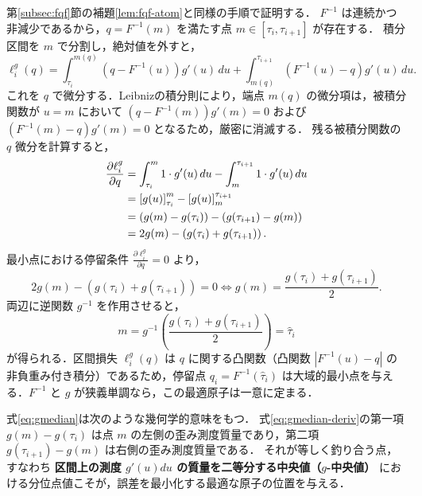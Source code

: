 \documentclass[a4paper,10pt]{jsarticle}
\makeatletter
\theoremstyle{definition}
\renewenvironment{proof}[1][\proofname]{\par
  \pushQED{\qed}%
  \normalfont \topsep6\p@\@plus6\p@\relax
  \trivlist
  \item[\hskip\labelsep\textbf{#1}]\ignorespaces
}{%
  \popQED\endtrivlist\@endpefalse
}
\renewcommand{\proofname}{証明}
\renewcommand{\Finv}{F^{-1}}
\makeatother
\begin{document}
\begin{proof}
第\ref{subsec:fqf}節の補題\ref{lem:fqf-atom}と同様の手順で証明する．
$\Finv$ は連続かつ非減少であるから，$q = \Finv(m)$ を満たす点 $m \in [\tau_i, \tau_{i+1}]$ が存在する．
積分区間を $m$ で分割し，絶対値を外すと，
\begin{equation}
  \ell_i^g(q) = \int_{\tau_i}^{m(q)} \left(q - \Finv(u)\right) g'(u)\,du + \int_{m(q)}^{\tau_{i+1}} \left(\Finv(u) - q\right) g'(u)\,du.
\end{equation}
これを $q$ で微分する．Leibnizの積分則により，端点 $m(q)$ の微分項は，被積分関数が $u=m$ において
$(q - \Finv(m))g'(m) = 0$ および $(\Finv(m) - q)g'(m) = 0$
となるため，厳密に消滅する．
残る被積分関数の $q$ 微分を計算すると，
\begin{align}
  \frac{\partial \ell_i^g}{\partial q}
  &= \int_{\tau_i}^m 1\cdot g'(u)\,du - \int_m^{\tau_{i+1}} 1\cdot g'(u)\,du \notag\\
  &= \left[g(u)\right]_{\tau_i}^m - \left[g(u)\right]_m^{\tau_{i+1}} \notag\\
  &= \left(g(m) - g(\tau_i)\right) - \left(g(\tau_{i+1}) - g(m)\right) \notag\\
  &= 2g(m) - \left(g(\tau_i) + g(\tau_{i+1})\right).
  \label{eq:gmedian-deriv}
\end{align}
最小点における停留条件 $\frac{\partial \ell_i^g}{\partial q} = 0$ より，
\begin{equation}
  2g(m) - \left(g(\tau_i) + g(\tau_{i+1})\right) = 0 \iff g(m) = \frac{g(\tau_i) + g(\tau_{i+1})}{2}.
\end{equation}
両辺に逆関数 $g^{-1}$ を作用させると，
\begin{equation}
  m = g^{-1}\!\left(\frac{g(\tau_i) + g(\tau_{i+1})}{2}\right) = \hat\tau_i
\end{equation}
が得られる．区間損失 $\ell_i^g(q)$ は $q$ に関する凸関数（凸関数 $|\Finv(u)-q|$ の非負重み付き積分）であるため，停留点 $q_i = \Finv(\hat\tau_i)$ は大域的最小点を与える．$\Finv$ と $g$ が狭義単調なら，この最適原子は一意に定まる．
\end{proof}

式\eqref{eq:gmedian}は次のような幾何学的意味をもつ．
式\eqref{eq:gmedian-deriv}の第一項 $g(m) - g(\tau_i)$ は点 $m$ の左側の歪み測度質量であり，第二項 $g(\tau_{i+1}) - g(m)$ は右側の歪み測度質量である．
それが等しく釣り合う点，すなわち \textbf{区間上の測度 $g'(u)du$ の質量を二等分する中央値（$g$-中央値）} における分位点値こそが，誤差を最小化する最適な原子の位置を与える．
\end{document}
